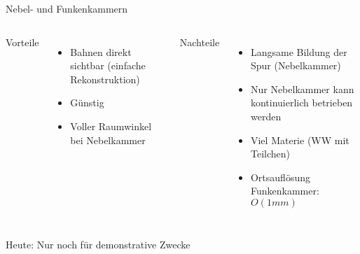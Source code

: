 
\begin{frame}{Nebel- und Funkenkammern}
    \begin{columns}[T]
			Vorteile		
			\vspace{0.7cm}
			\begin{itemize}
			  \item Bahnen direkt sichtbar (einfache Rekonstruktion)
			  \item Günstig
			  \item Voller Raumwinkel bei Nebelkammer
			\end{itemize}	
	    	Nachteile
	    	\vspace{0.7cm}
	    	\begin{itemize}
			  \item Langsame Bildung der Spur (Nebelkammer)
			  \item Nur Nebelkammer kann kontinuierlich betrieben werden
			  \item Viel Materie (WW mit Teilchen)
			  \item Ortsauflösung Funkenkammer: $O(1 mm)$
			\end{itemize}
    \end{columns}
    \vspace{1cm}
    Heute: Nur noch für demonstrative Zwecke
\end{frame}